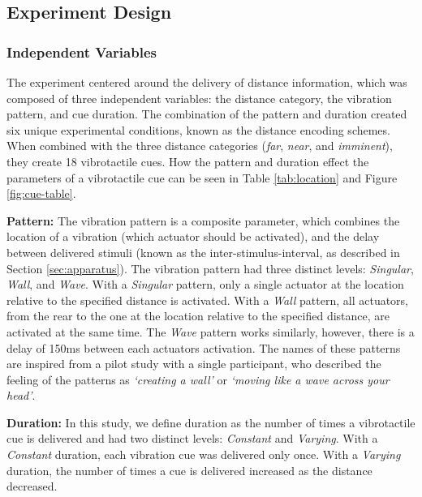 \documentclass{mpaper}
\begin{document}
\subsection{Experiment Design}
\subsubsection{Independent Variables}
The experiment centered around the delivery of distance information, which was composed of three independent variables: the distance category, the vibration pattern, and cue duration. The combination of the pattern and duration created six unique experimental conditions, known as the distance encoding schemes. When combined with the three distance categories (\textit{far}, \textit{near}, and \textit{imminent}), they create 18 vibrotactile cues. How the pattern and duration effect the parameters of a vibrotactile cue can be seen in Table \ref{tab:location} and Figure \ref{fig:cue-table}.

\textbf{Pattern:} The vibration pattern is a composite parameter, which combines the location of a vibration (which actuator should be activated), and the delay between delivered stimuli (known as the inter-stimulus-interval, as described in Section \ref{sec:apparatus}). The vibration pattern had three distinct levels: \textit{Singular}, \textit{Wall}, and \textit{Wave}. With a \textit{Singular} pattern, only a single actuator at the location relative to the specified distance is activated. With a \textit{Wall} pattern, all actuators, from the rear to the one at the location relative to the specified distance, are activated at the same time. The \textit{Wave} pattern works similarly, however, there is a delay of 150ms between each actuators activation. The names of these patterns are inspired from a pilot study with a single participant, who described the feeling of the patterns as \textit{‘creating a wall’} or \textit{‘moving like a wave across your head’}. 

\textbf{Duration:} In this study, we define duration as the number of times a vibrotactile cue is delivered and had two distinct levels: \textit{Constant} and \textit{Varying}. With a \textit{Constant} duration, each vibration cue was delivered only once. With a \textit{Varying} duration, the number of times a cue is delivered increased as the distance decreased. 
\end{document}
